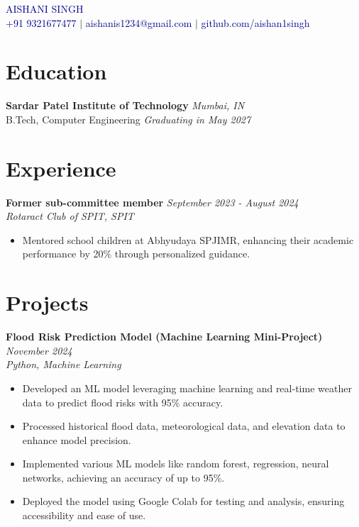 \documentclass{article}
\begin{document}
\thispagestyle{empty}

\begin{center}
    {\Huge \textcolor{darkblue}{AISHANI SINGH}} \\
    \vspace{5pt}
    \textcolor{darkblue}{+91 9321677477} $|$ \textcolor{darkblue}{aishanis1234@gmail.com} $|$ \textcolor{darkblue}{github.com/aishan1singh}
\end{center}

\section*{Education}
\textbf{Sardar Patel Institute of Technology} \hfill \textit{Mumbai, IN} \\
B.Tech, Computer Engineering \hfill \textit{Graduating in May 2027}

\section*{Experience}
\textbf{Former sub-committee member} \hfill \textit{September 2023 - August 2024} \\
\textit{Rotaract Club of SPIT, SPIT} \\
\begin{itemize}
    \item Mentored school children at Abhyudaya SPJIMR, enhancing their academic performance by 20\% through personalized guidance.
\end{itemize}

\section*{Projects}
\textbf{Flood Risk Prediction Model (Machine Learning Mini-Project)} \hfill \textit{November 2024} \\
\textit{Python, Machine Learning} \\
\begin{itemize}
    \item Developed an ML model leveraging machine learning and real-time weather data to predict flood risks with 95\% accuracy.
    \item Processed historical flood data, meteorological data, and elevation data to enhance model precision.
    \item Implemented various ML models like random forest, regression, neural networks, achieving an accuracy of up to 95\%.
    \item Deployed the model using Google Colab for testing and analysis, ensuring accessibility and ease of use.
\end{itemize}
\end{document}
